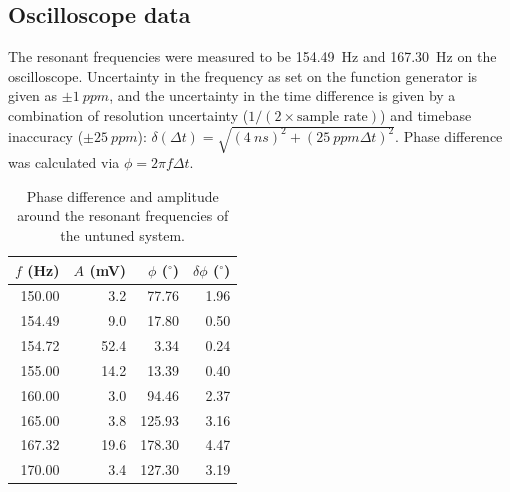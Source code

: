 \documentclass{article}
\begin{document}
\subsection{Oscilloscope data}
The resonant frequencies were measured to be \qty{154.49}{Hz} and \qty{167.30}{Hz} on the oscilloscope. Uncertainty in the frequency as set on the function generator is given as $\pm\qty{1}{ppm}$, and the uncertainty in the time difference is given by a combination of resolution uncertainty ($1/(2\times\text{sample rate})$) and timebase inaccuracy ($\pm\qty{25}{ppm}$):  $\delta(\Delta t) = \sqrt{\left( \qty{4}{ns} \right)^2 + \left( \qty{25}{ppm} \Delta t \right)^2}$.
Phase difference was calculated via $\phi = 2\pi f \Delta t$.

\begin{table}
  \centering
  \caption{Phase difference and amplitude around the resonant frequencies of the untuned system.}
  \begin{tabular}{@{}rrrr@{}}
    \toprule
    $f$ (\unit{Hz}) & $A$ (\unit{\mV}) & $\phi$ ($^\circ$) & $\delta\phi$ ($^\circ$) \\ \midrule
    150.00    & 3.2      &77.76 & 1.96    \\
    154.49   & 9.0      & 17.80 & 0.50   \\
    154.72   & 52.4     & 3.34 & 0.24   \\
    155.00    & 14.2     &13.39 & 0.40    \\
    160.00    & 3.0      &94.46 & 2.37    \\
    165.00    & 3.8      &125.93 & 3.16    \\
    167.32   & 19.6     & 178.30 & 4.47   \\
    170.00    & 3.4      &127.30 & 3.19    \\ \bottomrule
  \end{tabular}
  \label{tab:oscfa}
\end{table}
\end{document}
